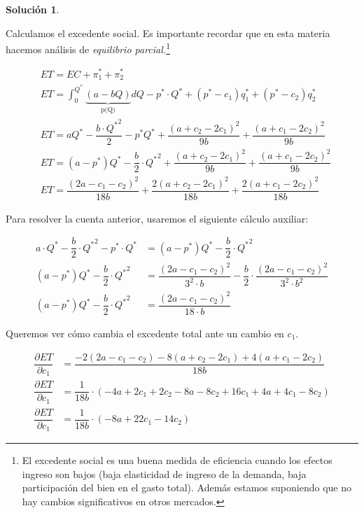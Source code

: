 \documentclass[a4paper, 11pt]{article}
\theoremstyle{definition}
\newtheorem{solucion}{Soluci\'on}
\begin{document}
\begin{solucion}
\begin{enumerate}[label=(\alph*)]
Calculamos el excedente social. Es importante recordar que en esta materia hacemos análisis de \textit{equilibrio parcial.}\footnote{El excedente social es una buena medida de eficiencia cuando los efectos ingreso son bajos (baja elasticidad de ingreso de la demanda, baja participación del bien en el gasto total). Además estamos suponiendo que no hay cambios significativos en otros mercados.}

\vspace*{-24pt}

\begin{align*}
&ET=EC+\pi_1^*+\pi_2^*\\
&ET=\displaystyle\int_{0}^{Q^*}\underbrace{(a-bQ)}_\text{p(Q)}dQ-p^*\cdot Q^*+(p^*-c_1)q_1^*+(p^*-c_2)q_2^*\\
&ET=aQ^*-\dfrac{b\cdot {Q^*}^2}{2}-p^*Q^*+\dfrac{(a+c_2-2c_1)^2}{9b}+\dfrac{(a+c_1-2c_2)^2}{9b}\\
&ET=(a-p^*)Q^*-\dfrac{b}{2}\cdot {Q^*}^2+\dfrac{(a+c_2-2c_1)^2}{9b}+\dfrac{(a+c_1-2c_2)^2}{9b}\\
&ET= \dfrac{(2a-c_1-c_2)^2}{18b}+\dfrac{2(a+c_2-2c_1)^2}{18b}+\dfrac{2(a+c_1-2c_2)^2}{18b}
\end{align*}

Para resolver la cuenta anterior, usaremos el siguiente cálculo auxiliar:

\vspace*{-16pt}

\begin{align*}
a\cdot Q^*-\dfrac{b}{2}\cdot {Q^*}^2-p^*\cdot Q^*&=(a-p^*)Q^*-\dfrac{b}{2}\cdot {Q^*}^2\\
(a-p^*)Q^*-\dfrac{b}{2}\cdot {Q^*}^2&= \dfrac{(2a-c_1-c_2)^2}{3^2\cdot b}-\dfrac{b}{2}\cdot \dfrac{(2a-c_1-c_2)^2}{3^2\cdot b^2}\\
(a-p^*)Q^*-\dfrac{b}{2}\cdot {Q^*}^2&=\dfrac{(2a-c_1-c_2)^2}{18\cdot b}
\end{align*}

Queremos ver cómo cambia el excedente total ante un cambio en $c_1$.

\vspace*{-16pt}

\begin{align*}
\dfrac{\partial ET}{\partial c_1}&= \dfrac{-2(2a-c_1-c_2)-8(a+c_2-2c_1)+4(a+c_1-2c_2)}{18b}\\
\dfrac{\partial ET}{\partial c_1}&= \dfrac{1}{18b}\cdot(-4a+2c_1+2c_2-8a-8c_2+16c_1+4a+4c_1-8c_2)\\
\dfrac{\partial ET}{\partial c_1}&= \dfrac{1}{18b}\cdot (-8a+22c_1-14c_2)
\end{align*}


\end{enumerate}
\end{solucion}
\end{document}

